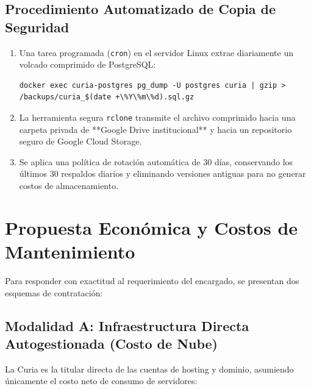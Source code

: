 \documentclass[11pt,a4paper]{article}
\begin{document}
\subsection{Procedimiento Automatizado de Copia de Seguridad}
\begin{enumerate}[leftmargin=1.2cm]
    \item Una tarea programada (\texttt{cron}) en el servidor Linux extrae diariamente un volcado comprimido de PostgreSQL:
\begin{lstlisting}[style=consola]
docker exec curia-postgres pg_dump -U postgres curia | gzip > /backups/curia_$(date +\%Y\%m\%d).sql.gz
\end{lstlisting}
    \item La herramienta segura \texttt{rclone} transmite el archivo comprimido hacia una carpeta privada de **Google Drive institucional** y hacia un repositorio seguro de Google Cloud Storage.
    \item Se aplica una política de rotación automática de 30 días, conservando los últimos 30 respaldos diarios y eliminando versiones antiguas para no generar costos de almacenamiento.
\end{enumerate}

\section{Propuesta Económica y Costos de Mantenimiento}

Para responder con exactitud al requerimiento del encargado, se presentan dos esquemas de contratación:

\subsection{Modalidad A: Infraestructura Directa Autogestionada (Costo de Nube)}
La Curia es la titular directa de las cuentas de hosting y dominio, asumiendo únicamente el costo neto de consumo de servidores:
\end{document}

